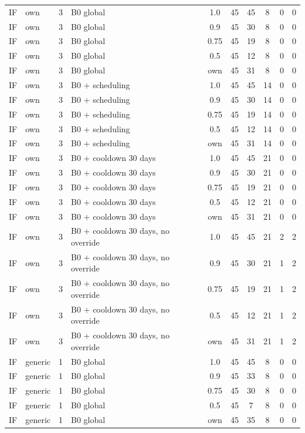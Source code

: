 \documentclass[10pt,onecolumn,letterpaper]{article}
\begin{document}
\begin{longtable}{lllp{4.4cm}cccccc}
IF & own & 3 & B0 global & 1.0 & 45 & 45 & 8 & 0 & 0 \\
IF & own & 3 & B0 global & 0.9 & 45 & 30 & 8 & 0 & 0 \\
IF & own & 3 & B0 global & 0.75 & 45 & 19 & 8 & 0 & 0 \\
IF & own & 3 & B0 global & 0.5 & 45 & 12 & 8 & 0 & 0 \\
IF & own & 3 & B0 global & own & 45 & 31 & 8 & 0 & 0 \\
IF & own & 3 & B0 + scheduling & 1.0 & 45 & 45 & 14 & 0 & 0 \\
IF & own & 3 & B0 + scheduling & 0.9 & 45 & 30 & 14 & 0 & 0 \\
IF & own & 3 & B0 + scheduling & 0.75 & 45 & 19 & 14 & 0 & 0 \\
IF & own & 3 & B0 + scheduling & 0.5 & 45 & 12 & 14 & 0 & 0 \\
IF & own & 3 & B0 + scheduling & own & 45 & 31 & 14 & 0 & 0 \\
IF & own & 3 & B0 + cooldown 30 days & 1.0 & 45 & 45 & 21 & 0 & 0 \\
IF & own & 3 & B0 + cooldown 30 days & 0.9 & 45 & 30 & 21 & 0 & 0 \\
IF & own & 3 & B0 + cooldown 30 days & 0.75 & 45 & 19 & 21 & 0 & 0 \\
IF & own & 3 & B0 + cooldown 30 days & 0.5 & 45 & 12 & 21 & 0 & 0 \\
IF & own & 3 & B0 + cooldown 30 days & own & 45 & 31 & 21 & 0 & 0 \\
IF & own & 3 & B0 + cooldown 30 days, no override & 1.0 & 45 & 45 & 21 & 2 & 2 \\
IF & own & 3 & B0 + cooldown 30 days, no override & 0.9 & 45 & 30 & 21 & 1 & 2 \\
IF & own & 3 & B0 + cooldown 30 days, no override & 0.75 & 45 & 19 & 21 & 1 & 2 \\
IF & own & 3 & B0 + cooldown 30 days, no override & 0.5 & 45 & 12 & 21 & 1 & 2 \\
IF & own & 3 & B0 + cooldown 30 days, no override & own & 45 & 31 & 21 & 1 & 2 \\
IF & generic & 1 & B0 global & 1.0 & 45 & 45 & 8 & 0 & 0 \\
IF & generic & 1 & B0 global & 0.9 & 45 & 33 & 8 & 0 & 0 \\
IF & generic & 1 & B0 global & 0.75 & 45 & 30 & 8 & 0 & 0 \\
IF & generic & 1 & B0 global & 0.5 & 45 & 7 & 8 & 0 & 0 \\
IF & generic & 1 & B0 global & own & 45 & 35 & 8 & 0 & 0 \\

\end{longtable}
\end{document}
